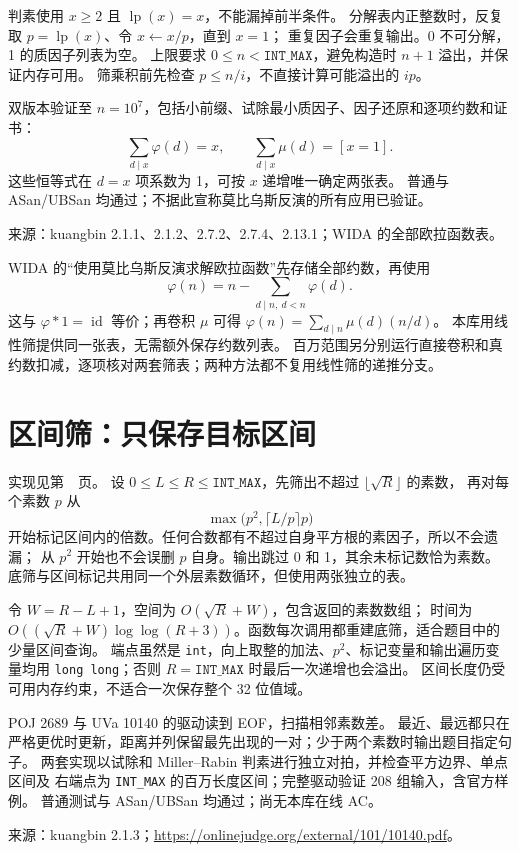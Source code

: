 判素使用 $x\ge2$ 且 $\operatorname{lp}(x)=x$，不能漏掉前半条件。
分解表内正整数时，反复取 $p=\operatorname{lp}(x)$、令 $x\gets x/p$，直到 $x=1$；
重复因子会重复输出。0 不可分解，1 的质因子列表为空。
上限要求 $0\le n<\texttt{INT\_MAX}$，避免构造时 $n+1$ 溢出，并保证内存可用。
筛乘积前先检查 $p\le n/i$，不直接计算可能溢出的 $ip$。

双版本验证至 $n=10^7$，包括小前缀、试除最小质因子、因子还原和逐项约数和证书：
\[
\sum_{d\mid x}\varphi(d)=x,\qquad\sum_{d\mid x}\mu(d)=[x=1].
\]
这些恒等式在 $d=x$ 项系数为 1，可按 $x$ 递增唯一确定两张表。
普通与 ASan/UBSan 均通过；不据此宣称莫比乌斯反演的所有应用已验证。

来源：kuangbin 2.1.1、2.1.2、2.7.2、2.7.4、2.13.1；WIDA 的全部欧拉函数表。

WIDA 的“使用莫比乌斯反演求解欧拉函数”先存储全部约数，再使用
\[
\varphi(n)=n-\sum_{d\mid n,\ d<n}\varphi(d).
\]
这与 $\varphi*1=\operatorname{id}$ 等价；再卷积 $\mu$ 可得
$\varphi(n)=\sum_{d\mid n}\mu(d)(n/d)$。
本库用线性筛提供同一张表，无需额外保存约数列表。
百万范围另分别运行直接卷积和真约数扣减，逐项核对两套筛表；两种方法都不复用线性筛的递推分支。


\section{区间筛：只保存目标区间}\label{knowledge-segmented-sieve}
实现见第~\pageref{compact-segmented_primes}~页。
设 $0\le L\le R\le\texttt{INT\_MAX}$，先筛出不超过 $\lfloor\sqrt R\rfloor$ 的素数，
再对每个素数 $p$ 从
\[
\max\bigl(p^2,\lceil L/p\rceil p\bigr)
\]
开始标记区间内的倍数。任何合数都有不超过自身平方根的素因子，所以不会遗漏；
从 $p^2$ 开始也不会误删 $p$ 自身。输出跳过 0 和 1，其余未标记数恰为素数。
底筛与区间标记共用同一个外层素数循环，但使用两张独立的表。

令 $W=R-L+1$，空间为 $O(\sqrt R+W)$，包含返回的素数数组；
时间为 $O((\sqrt R+W)\log\log(R+3))$。函数每次调用都重建底筛，适合题目中的少量区间查询。
端点虽然是 \texttt{int}，向上取整的加法、$p^2$、标记变量和输出遍历变量均用
\texttt{long long}；否则 $R=\texttt{INT\_MAX}$ 时最后一次递增也会溢出。
区间长度仍受可用内存约束，不适合一次保存整个 32 位值域。

POJ 2689 与 UVa 10140 的驱动读到 EOF，扫描相邻素数差。
最近、最远都只在严格更优时更新，距离并列保留最先出现的一对；少于两个素数时输出题目指定句子。
两套实现以试除和 Miller--Rabin 判素进行独立对拍，并检查平方边界、单点区间及
右端点为 \texttt{INT\_MAX} 的百万长度区间；完整驱动验证 208 组输入，含官方样例。
普通测试与 ASan/UBSan 均通过；尚无本库在线 AC。

来源：kuangbin 2.1.3；\url{https://onlinejudge.org/external/101/10140.pdf}。

